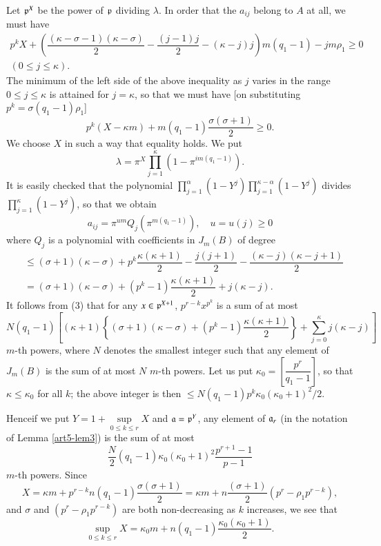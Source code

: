 Let $\mathfrak{p}^X$ be the power of $\mathfrak{p}$ dividing $\lambda$. In order that the $a_{ij}$ belong to $A$ at all, we must have
\begin{multline*}
p^k X + \left( \dfrac{(\kappa - \sigma - 1)(\kappa- \sigma)}{2} - \dfrac{(j-1)j}{2} - (\kappa - j) j\right) m (q_1 -1) - jm\rho_1 \geq 0 \\
(0 \leq j \leq \kappa).
\end{multline*}
The minimum of the left side of the above inequality as $j$ varies in the range $0 \leq j \leq \kappa$ is attained for $j = \kappa$, so that we must have [on substituting $p^k = \sigma (q_1 -1)  \rho_1$]
$$
p^k (X-\kappa m) +m (q_1 -1) \dfrac{\sigma (\sigma +1)}{2} \geq 0.
$$
We choose $X$ in such a way that equality holds. We put 
$$
\lambda = \pi^X \prod\limits^\kappa_{j=1} (1 - \pi^{im(q_1 -1)}).
$$
It is easily checked that the polynomial $\prod\limits^\alpha_{j=1} (1-Y^j) \prod\limits^{\kappa -\alpha}_{j=1} (1-Y^j)$ divides $\prod\limits^\kappa_{j=1} (1 - Y^j)$, so that we obtain
$$
a_{ij} = \pi^{um} Q_j (\pi^{m(q_1 -1)}), \quad u = u (j) \geq 0 
$$
where $Q_j$ is a polynomial with coefficients in $J_m (B)$ of degree
\begin{align*}
& \leq (\sigma +1) (\kappa - \sigma) + p^k \dfrac{\kappa(\kappa+1)}{2} -\dfrac{j(j+1)}{2} - \dfrac{(\kappa - j) (\kappa - j +1)}{2}\\
& = (\sigma +1) (\kappa -\sigma) + (p^k -1) \dfrac{\kappa (\kappa +1)}{2} + j (\kappa - j).
\end{align*}
It follows from (3) that for any $x \in \mathfrak{p}^{X+1}$, $p^{r-k} x^{p^k}$ is a sum of at most 
$$
N (q_1-1) \left[ (\kappa +1) \left\{(\sigma +1) (\kappa -\sigma) + (p^k-1) \dfrac{\kappa (\kappa +1)}{2} \right\} + \sum\limits^\kappa_{j=0} j (\kappa - j) \right]
$$
$m$-th powers, where $N$ denotes the smallest integer such that any element of $J_m (B)$ is the sum of at most $N$ $m$-th powers. Let us put $\kappa_0 = \left[ \dfrac{p^r}{q_1 - 1}\right]$, so that $\kappa \leq \kappa_0$ for all $k$; the above integer is then $\leq N (q_1 -1) p^k \kappa_0 (\kappa_0 +1)^2 /2$.

Hence\pageoriginale if we put $Y=1+\sup\limits_{{0\le k\le r}} X$ and $\mathfrak{a}=\mathfrak{p}^Y$, any element of $\mathfrak{a}_r$ (in the notation of Lemma \ref{art5-lem3}) is the sum of at most
$$
\dfrac{N}{2} (q_1-1) \kappa_0 (\kappa_0+1)^2 \dfrac{p^{r+1} -1}{p-1}
$$
$m$-th powers. Since
$$
X = \kappa m + p^{r-k} n (q_1-1) \dfrac{\sigma (\sigma +1)}{2} = \kappa m + n \dfrac{(\sigma +1 )}{2} (p^r - \rho_1 p^{r-k}),
$$
and $\sigma$ and $(p^r - \rho_1 p^{r-k})$ are both non-decreasing as $k$ increases, we see that 
$$
\sup\limits_{0\leq k\leq r} X = \kappa_0 m + n (q_1-1) \dfrac{\kappa_0(\kappa_0+1)}{2}.
$$

